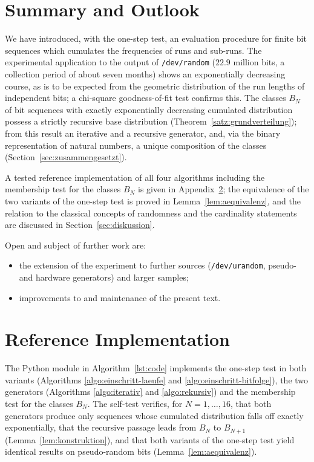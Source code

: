 \documentclass[11pt,a4paper]{scrartcl}
\theoremstyle{plain}
\theoremstyle{definition}
\theoremstyle{remark}
\begin{document}
\section{Summary and Outlook}\label{sec:schluss}

We have introduced, with the one-step test, an evaluation procedure
for finite bit sequences which cumulates the frequencies of runs and
sub-runs. The experimental application to the output of
\texttt{/dev/random} ($22.9$ million bits, a collection period of
about seven months) shows an exponentially decreasing course, as is
to be expected from the geometric distribution of the run lengths of
independent bits; a chi-square goodness-of-fit test confirms this.
The classes $B_N$ of bit sequences with exactly exponentially
decreasing cumulated distribution possess a strictly recursive base
distribution (Theorem~\ref{satz:grundverteilung}); from this result
an iterative and a recursive generator, and, via the binary
representation of natural numbers, a unique composition of the
classes (Section~\ref{sec:zusammengesetzt}).

A tested reference implementation of all four algorithms including
the membership test for the classes $B_N$ is given in
Appendix~\ref{sec:code}; the equivalence of the two variants of the
one-step test is proved in Lemma~\ref{lem:aequivalenz}, and the
relation to the classical concepts of randomness and the cardinality
statements are discussed in Section~\ref{sec:diskussion}.

Open and subject of further work are:
\begin{itemize}
  \item the extension of the experiment to further sources
        (\texttt{/dev/urandom}, pseudo- and hardware generators) and
        larger samples;
  \item improvements to and maintenance of the present text.
\end{itemize}

\appendix
\section{Reference Implementation}\label{sec:code}

The Python module in Algorithm~\ref{lst:code} implements the
one-step test in both variants (Algorithms
\ref{algo:einschritt-laeufe} and \ref{algo:einschritt-bitfolge}), the
two generators (Algorithms \ref{algo:iterativ} and
\ref{algo:rekursiv}) and the membership test for the classes $B_N$.
The self-test verifies, for $N=1,\dots,16$, that both generators
produce only sequences whose cumulated distribution falls off exactly
exponentially, that the recursive passage leads from $B_N$ to
$B_{N+1}$ (Lemma~\ref{lem:konstruktion}), and that both variants of
the one-step test yield identical results on pseudo-random bits
(Lemma~\ref{lem:aequivalenz}).



\printbibliography[title={References}]
\end{document}
